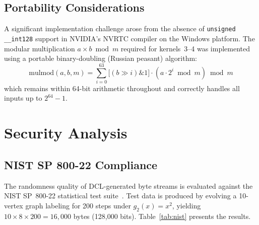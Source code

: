 \documentclass[lettersize,journal]{IEEEtran}
\begin{document}
\subsection{Portability Considerations}

A significant implementation challenge arose from the absence of \texttt{unsigned \_\_int128} support in NVIDIA's NVRTC compiler on the Windows platform. The modular multiplication $a \times b \bmod m$ required for kernels~3--4 was implemented using a portable binary-doubling (Russian peasant) algorithm:
\begin{equation}
\text{mulmod}(a, b, m) = \sum_{i=0}^{63} \bigl[(b \gg i) \mathbin{\&} 1\bigr] \cdot (a \cdot 2^i \bmod m) \bmod m
\label{eq:mulmod}
\end{equation}
which remains within 64-bit arithmetic throughout and correctly handles all inputs up to $2^{64} - 1$.

\section{Security Analysis}
\label{sec:security}

\subsection{NIST SP 800-22 Compliance}

The randomness quality of DCL-generated byte streams is evaluated against the NIST SP~800-22 statistical test suite~\cite{nist2010}. Test data is produced by evolving a 10-vertex graph labeling for 200 steps under $g_2(x) = x^2$, yielding $10 \times 8 \times 200 = 16{,}000$ bytes (128{,}000 bits). Table~\ref{tab:nist} presents the results.
\end{document}
